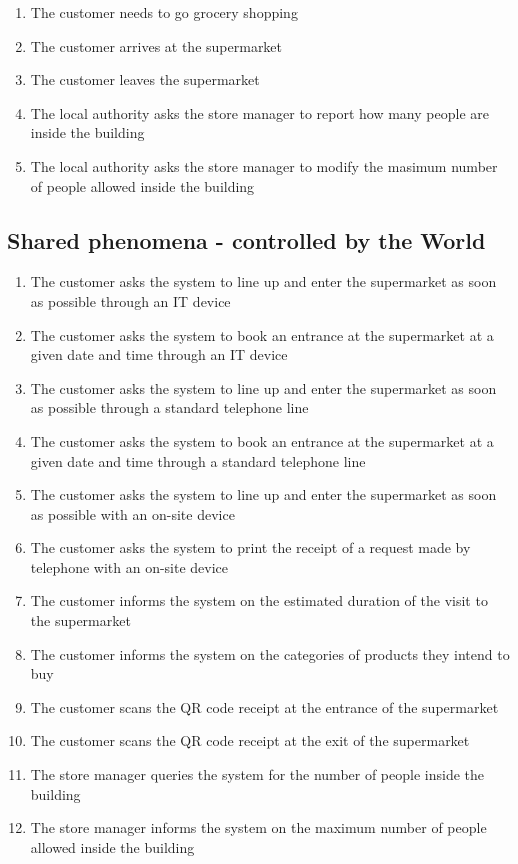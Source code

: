 \documentclass[../../main.tex]{subfiles}
\begin{document}
\begin{enumerate}
  \item The customer needs to go grocery shopping
  \item The customer arrives at the supermarket
  \item The customer leaves the supermarket
  \item The local authority asks the store manager to report how many people are
  inside the building
  \item The local authority asks the store manager to modify the masimum number
  of people allowed inside the building
\end{enumerate}

\subsection{Shared phenomena - controlled by the World}

\begin{enumerate}
  \item The customer asks the system to line up and enter the supermarket as
  soon as possible through an IT device
  \item The customer asks the system to book an entrance at the supermarket at a
  given date and time through an IT device
  \item The customer asks the system to line up and enter the supermarket as
  soon as possible through a standard telephone line
  \item The customer asks the system to book an entrance at the supermarket at a
  given date and time through a standard telephone line
  \item The customer asks the system to line up and enter the supermarket as
  soon as possible with an on-site device
  \item The customer asks the system to print the receipt of a request made by
  telephone with an on-site device
  \item The customer informs the system on the estimated duration of the visit
  to the supermarket
  \item The customer informs the system on the categories of products they
  intend to buy
  \item The customer scans the QR code receipt at the entrance of the
  supermarket
  \item The customer scans the QR code receipt at the exit of the supermarket
  \item The store manager queries the system for the number of people inside the
  building
  \item The store manager informs the system on the maximum number of people
  allowed inside the building
\end{enumerate}
\end{document}

